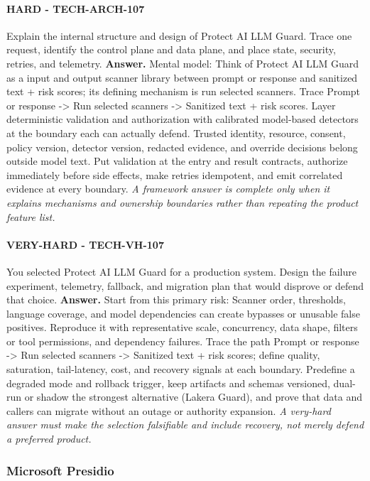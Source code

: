 \paragraph{HARD - TECH-ARCH-107} Explain the internal structure and design of Protect AI LLM Guard. Trace one request, identify the control plane and data plane, and place state, security, retries, and telemetry.
\textbf{Answer.} Mental model: Think of Protect AI LLM Guard as a input and output scanner library between prompt or response and sanitized text + risk scores; its defining mechanism is run selected scanners. Trace Prompt or response -> Run selected scanners -> Sanitized text + risk scores. Layer deterministic validation and authorization with calibrated model-based detectors at the boundary each can actually defend. Trusted identity, resource, consent, policy version, detector version, redacted evidence, and override decisions belong outside model text. Put validation at the entry and result contracts, authorize immediately before side effects, make retries idempotent, and emit correlated evidence at every boundary.
\textit{A framework answer is complete only when it explains mechanisms and ownership boundaries rather than repeating the product feature list.}
\paragraph{VERY-HARD - TECH-VH-107} You selected Protect AI LLM Guard for a production system. Design the failure experiment, telemetry, fallback, and migration plan that would disprove or defend that choice.
\textbf{Answer.} Start from this primary risk: Scanner order, thresholds, language coverage, and model dependencies can create bypasses or unusable false positives. Reproduce it with representative scale, concurrency, data shape, filters or tool permissions, and dependency failures. Trace the path Prompt or response -> Run selected scanners -> Sanitized text + risk scores; define quality, saturation, tail-latency, cost, and recovery signals at each boundary. Predefine a degraded mode and rollback trigger, keep artifacts and schemas versioned, dual-run or shadow the strongest alternative (Lakera Guard), and prove that data and callers can migrate without an outage or authority expansion.
\textit{A very-hard answer must make the selection falsifiable and include recovery, not merely defend a preferred product.}
\subsubsection*{Microsoft Presidio}
